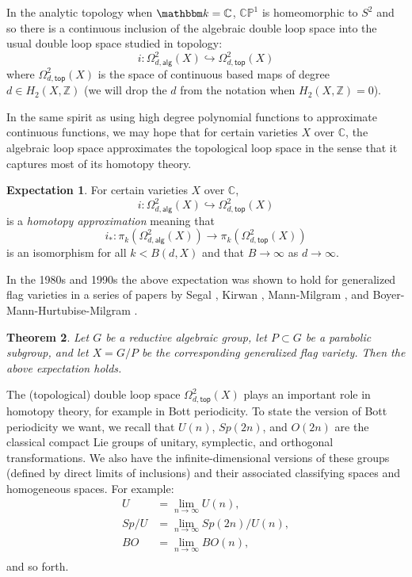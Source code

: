 \documentclass{amsart}
\newtheorem{theorem}{Theorem}[section]
\theoremstyle{definition}
\newtheorem{expectation}[theorem]{Expectation}
\newcommand{\CC} {{\mathbb C}}          %
\newcommand{\ZZ} {{\mathbb Z}}		%
\newcommand{\kk} {{\mathbbm k}}
\newcommand{\PP}{\mathbb{P}}
\newcommand{\alg}{\mathsf{alg}}
\renewcommand{\top}{\mathsf{top}}
\newcommand{\LoopTwo}{\Omega^{2}_{d,\alg}}
\newcommand{\LoopTwoTop}{\Omega^{2}_{d,\top}}
\begin{document}
In the analytic topology when $\kk =\CC$, $\CC \PP^{1}$ is homeomorphic to
$S^{2}$ and so there is a continuous inclusion of the algebraic double loop
space into the usual double loop space studied in topology:
\[
i:   \LoopTwo (X) \hookrightarrow \LoopTwoTop (X)
\]
where $\LoopTwoTop (X)$ is the space of continuous based maps of
degree $d\in H_{2}(X,\ZZ )$ (we will drop the $d$ from the notation
when $H_{2}(X,\ZZ )=0$). 

In the same spirit as using high degree polynomial functions to
approximate continuous functions, we may hope that for certain
varieties $X$ over $\CC$, the algebraic loop space approximates the
topological loop space in the sense that it captures most of its
homotopy theory.

\begin{expectation}
For certain varieties $X$ over $\CC$, 
\[
i:\LoopTwo (X) \hookrightarrow \LoopTwoTop
(X)
\]
is a \emph{homotopy approximation} meaning that 
\[
i_{*}:\pi_{k}(\LoopTwo (X)) \to \pi_{k}( \LoopTwoTop (X))
\]
is an isomorphism for all $k<B(d,X)$ and that $B\to \infty $ as $d\to
\infty$. 
\end{expectation}

In the 1980s and 1990s the above expectation was shown to hold for
generalized flag varieties in a series of papers by Segal \cite{Segal-1979}, Kirwan \cite{Kirwan-1986},
Mann-Milgram \cite{Mann-Milgram-93}, and Boyer-Mann-Hurtubise-Milgram \cite{Boyer-Mann-Hurtubise-Milgram}.

\begin{theorem}\label{thm: Mann-Milgram algebraic loop approximation
holds for generalized flag varieties}
Let $G$ be a reductive algebraic group, let $P\subset G$
be a parabolic subgroup, and let $X=G/P$ be the corresponding
generalized flag variety. Then the above expectation holds.
\end{theorem}

The (topological) double loop space $\LoopTwoTop (X)$ plays an
important role in homotopy theory, for example in Bott periodicity. To
state the version of Bott periodicity we want, we recall that $U(n)$,
$Sp(2n)$, and $O(2n)$ are the classical compact Lie groups of unitary,
symplectic, and orthogonal transformations. We also have the
infinite-dimensional versions of these groups (defined by direct limits of
inclusions) and their associated classifying spaces and homogeneous
spaces. For example:
\begin{align*}
U&=\lim_{n\to  \infty} U(n),\\
Sp/U& = \lim_{n\to  \infty} Sp(2n)/U(n),\\
BO& = \lim_{n\to  \infty} BO(n),\\
\end{align*}
and so forth.
\end{document}

